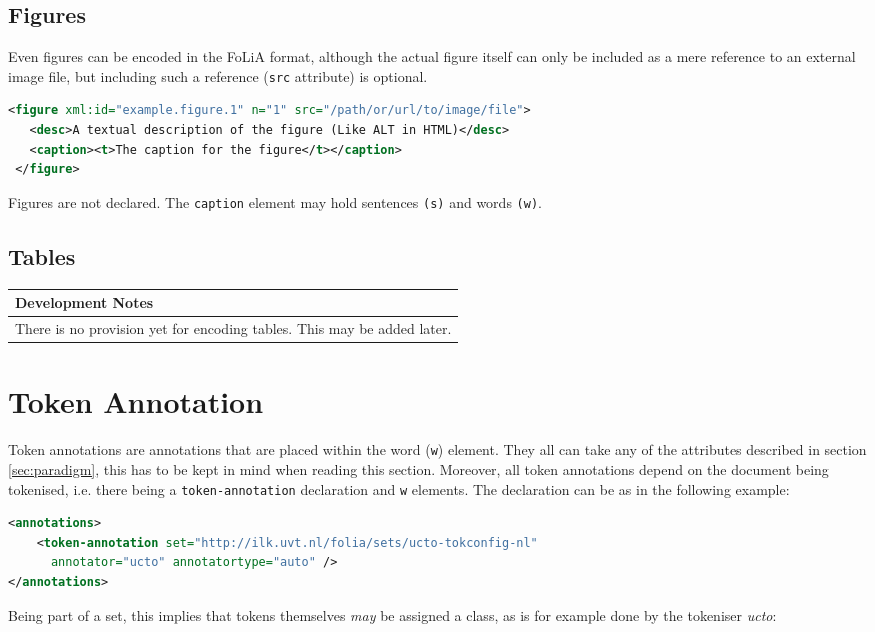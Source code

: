 \documentclass[a4paper,12pt]{report}
\newenvironment{devnotes}
{
\begin{center}
    \begin{tabular}[h!]{|p{0.8\textwidth}|}
    \hline
    {\bf Development Notes}\\\hline}
{   \\\hline
    \end{tabular}
\end{center}}
\begin{document}
\subsection{Figures}

Even figures can be encoded in the FoLiA format, although the actual figure itself can only be included as a mere reference to an external image file, but including such a reference (\texttt{src} attribute) is optional.

\begin{lstlisting}[language=xml]
 <figure xml:id="example.figure.1" n="1" src="/path/or/url/to/image/file">
   <desc>A textual description of the figure (Like ALT in HTML)</desc>
   <caption><t>The caption for the figure</t></caption>
 </figure>
\end{lstlisting}

Figures are not declared. The \texttt{caption} element may hold sentences \texttt{(s)} and words \texttt{(w)}.

\subsection{Tables}

\begin{devnotes}
There is no provision yet for encoding tables. This may be added later.
\end{devnotes}

\section{Token Annotation}

Token annotations are annotations that are placed within the word (\texttt{w}) element. They all can take any of the attributes described in section \ref{sec:paradigm}, this has to be kept in mind when reading this section. Moreover, all token annotations depend on the document being tokenised, i.e. there being a \texttt{token-annotation} declaration and \texttt{w} elements. The declaration can be as in the following example:

\begin{lstlisting}[language=xml]
<annotations>
    <token-annotation set="http://ilk.uvt.nl/folia/sets/ucto-tokconfig-nl"
      annotator="ucto" annotatortype="auto" />
</annotations>
\end{lstlisting}

Being part of a set, this implies that tokens themselves \emph{may} be assigned a class, as is for example done by the tokeniser \emph{ucto}:
\end{document}

